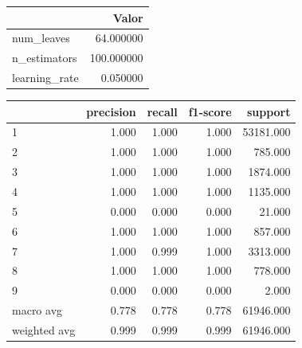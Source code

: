 \small
\begin{tabular}{lr}
\toprule
 & Valor \\
\midrule
num\_leaves & 64.000000 \\
n\_estimators & 100.000000 \\
learning\_rate & 0.050000 \\
\bottomrule
\end{tabular}

\small
\begin{tabular}{lrrrr}
\toprule
 & precision & recall & f1-score & support \\
\midrule
1 & 1.000 & 1.000 & 1.000 & 53181.000 \\
2 & 1.000 & 1.000 & 1.000 & 785.000 \\
3 & 1.000 & 1.000 & 1.000 & 1874.000 \\
4 & 1.000 & 1.000 & 1.000 & 1135.000 \\
5 & 0.000 & 0.000 & 0.000 & 21.000 \\
6 & 1.000 & 1.000 & 1.000 & 857.000 \\
7 & 1.000 & 0.999 & 1.000 & 3313.000 \\
8 & 1.000 & 1.000 & 1.000 & 778.000 \\
9 & 0.000 & 0.000 & 0.000 & 2.000 \\
macro avg & 0.778 & 0.778 & 0.778 & 61946.000 \\
weighted avg & 0.999 & 0.999 & 0.999 & 61946.000 \\
\bottomrule
\end{tabular}
